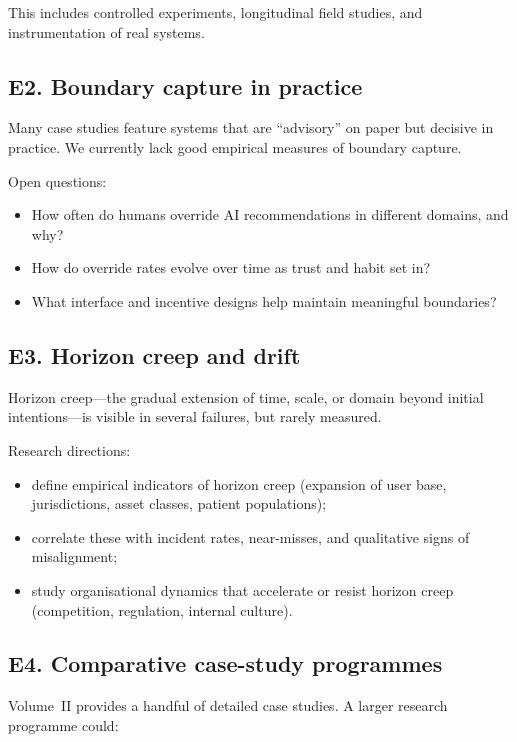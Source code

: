 This includes controlled experiments, longitudinal field studies, and
instrumentation of real systems.

\subsection{E2. Boundary capture in practice}

Many case studies feature systems that are ``advisory'' on paper but
decisive in practice.
We currently lack good empirical measures of boundary capture.

Open questions:

\begin{itemize}
  \item How often do humans override AI recommendations in different
        domains, and why?
  \item How do override rates evolve over time as trust and habit set
        in?
  \item What interface and incentive designs help maintain meaningful
        boundaries?
\end{itemize}

\subsection{E3. Horizon creep and drift}

Horizon creep---the gradual extension of time, scale, or domain
beyond initial intentions---is visible in several failures, but rarely
measured.

Research directions:

\begin{itemize}
  \item define empirical indicators of horizon creep (expansion of
        user base, jurisdictions, asset classes, patient populations);
  \item correlate these with incident rates, near-misses, and
        qualitative signs of misalignment;
  \item study organisational dynamics that accelerate or resist
        horizon creep (competition, regulation, internal culture).
\end{itemize}

\subsection{E4. Comparative case-study programmes}

Volume~II provides a handful of detailed case studies.
A larger research programme could:

